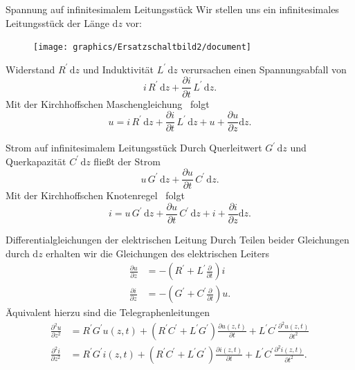 \documentclass{beamer}
\begin{document}
\begin{frame}{Spannung auf infinitesimalem Leitungsstück}
Wir stellen uns ein infinitesimales Leitungsstück der Länge $\mathrm{d}z$ vor:
\begin{figure}[!htb]
    \begin{center}
        \texttt{[image: graphics/Ersatzschaltbild2/document]}
    \end{center}
\end{figure}
Widerstand $R^{\prime} \, \mathrm{d}z$ und Induktivität $L^{\prime} \, \mathrm{d}z$ verursachen einen Spannungsabfall
von
\[
i \, R^{\prime} \, \mathrm{d}z + \frac{\partial i}{\partial t} \, L^{\prime} \, \mathrm{d}z.
\]
Mit der Kirchhoffschen Maschengleichung~\cite{Kirchhoff} folgt
\begin{equation*}
    u = i \, R^{\prime} \, \mathrm{d}z + \frac{\partial i}{\partial t} \, L^{\prime} \, \mathrm{d}z +
    u + \frac{\partial u}{\partial z} \mathrm{d}{z}.
\end{equation*}

\end{frame}


\begin{frame}{Strom auf infinitesimalem Leitungsstück}
Durch Querleitwert $G^{\prime} \, \mathrm{d}z$ und Querkapazität $C^{\prime} \, \mathrm{d}z$ fließt der Strom
\[
u \, G^{\prime} \, \mathrm{d}z + \frac{\partial u}{\partial t} \, C^{\prime} \, \mathrm{d}z.
\]
Mit der Kirchhoffschen Knotenregel~\cite{Kirchhoff} folgt
\begin{equation*}
    i = u \, G^{\prime} \, \mathrm{d}z + \frac{\partial u}{\partial t} \, C^{\prime} \, \mathrm{d}z + i +
    \frac{\partial i}{\partial z} \mathrm{d}z.
\end{equation*}

\end{frame}


\begin{frame}{Differentialgleichungen der elektrischen Leitung}
Durch Teilen beider Gleichungen durch $\mathrm{d}z$ erhalten wir die \alert{Gleichungen des elektrischen Leiters}
\begin{align}
    \frac{\partial u}{\partial z} &= -\left(R^{\prime} + L^{\prime}\frac{\partial}{\partial t}\right)i \label{eq:Dgl1}
    \\[1ex]
    \frac{\partial i}{\partial z} &= -\left(G^{\prime} + C^{\prime}\frac{\partial}{\partial t}\right)u. \label{eq:Dgl2}
\end{align}
Äquivalent hierzu sind die \alert{Telegraphenleitungen}
\begin{align}
    \frac{\partial^{2} u}{\partial z^{2}} &= R^{\prime} G^{\prime} u(z,t) + (R^{\prime} C^{\prime} + L^{\prime}
    G^{\prime}) \frac{\partial u(z, t)}{\partial t} + L^{\prime} C^{\prime} \frac{\partial^{2} u(z,t)}{\partial t^{2}}
    \label{eq:Tele1} \\[1.5ex]
    \frac{\partial^{2} i}{\partial z^{2}} &= R^{\prime} G^{\prime} i(z,t) + (R^{\prime} C^{\prime} + L^{\prime}
    G^{\prime}) \frac{\partial i(z, t)}{\partial t} + L^{\prime} C^{\prime} \frac{\partial^{2} i(z, t)}{\partial t^{2}}.
\end{align}

\end{frame}
\end{document}

